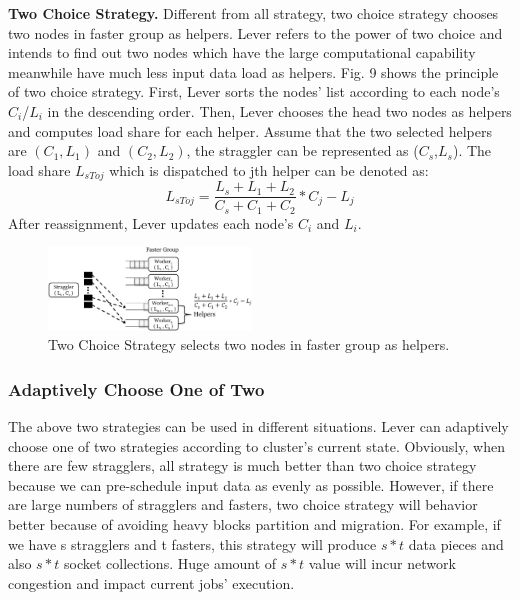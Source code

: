 \documentclass[10pt,conference,compsocconf,letterpaper]{IEEEtran}
\begin{document}
  \textbf{Two Choice Strategy.} Different from all strategy, two choice strategy chooses two nodes in faster group as helpers. Lever refers to the power of two choice\cite{Mitzenmacher1996} and intends to find out two nodes which have the large computational capability meanwhile have much less input data load as helpers. Fig. 9 shows the principle of two choice strategy. First, Lever sorts the nodes' list according to each node's \emph{$C_i$}/\emph{$L_i$} in the descending order. Then, Lever chooses the head two nodes as helpers and computes load share for each helper. Assume that the two selected helpers are $(C_1, L_1)$ and $(C_2, L_2)$, the straggler can be represented as (\emph{$C_s$},\emph{$L_s$}). The load share \emph{{$L_{sToj}$}} which is dispatched to jth helper can be denoted as:
  \begin{equation}
  L_{sToj} = \frac{L_s + L_1 + L_2}{C_s + C_1 + C_2}*C_j - L_j
  \end{equation}
  After reassignment, Lever updates each node's $C_i$ and $L_i$.
  \begin{figure}[htbp]
    \centering
    \includegraphics[width=0.48\textwidth]{FigureS2}
    \caption{Two Choice Strategy selects two nodes in faster group as helpers.}
    \label{Fig. 9:}
  \end{figure}

\subsubsection{Adaptively Choose One of Two}

  The above two strategies can be used in different situations. Lever can adaptively choose one of two strategies according to cluster's current state. Obviously, when there are few stragglers, all strategy is much better than two choice strategy because we can pre-schedule input data as evenly as possible. However, if there are large numbers of stragglers and fasters, two choice strategy will behavior better because of avoiding heavy blocks partition and migration. For example, if we have s stragglers and t fasters, this strategy will produce $s*t$ data pieces and also $s*t$ socket collections. Huge amount of $s*t$ value will incur network congestion and impact current jobs' execution.
\end{document}
